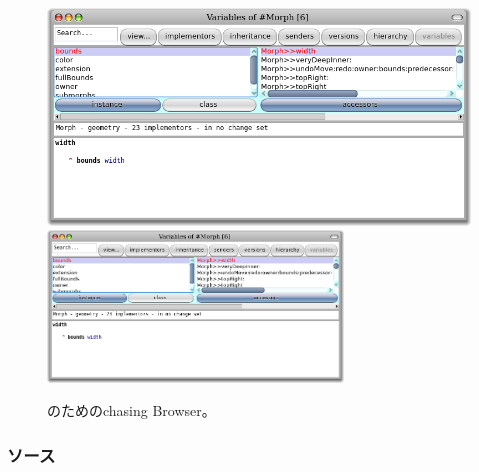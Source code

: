 \documentclass[a4paper,10pt,twoside]{book}
\begin{document}
\begin{figure}[btp]
	\begin{center}
	\ifluluelse
		{\includegraphics[width=\textwidth]{chasingBrowser}}
		{\includegraphics[width=0.7\textwidth]{chasingBrowser}}
	\end{center}
	\caption{のためのchasing Browser。}
\end{figure}



\subsubsection{ソース}
\end{document}
